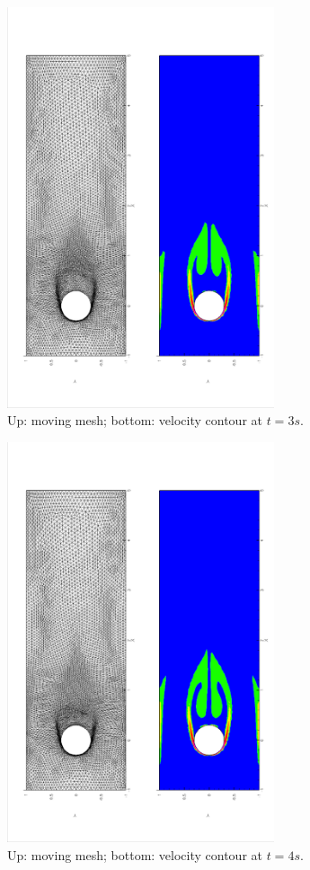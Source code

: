 \documentclass[a4paper, 11pt]{article}
\begin{document}
     \begin{figure}[!htbp]
        \centering
        \includegraphics[width = 0.7\textwidth, angle = -90]{picture/obstacle_flow_data/mesh_t_3s.eps}
        \caption{\small Up: moving mesh; bottom: velocity contour at
          $t = 3s$.}
        \label{fig::cylinder_mesh_t3s}
      \end{figure}

     \begin{figure}[!htbp]
        \centering
        \includegraphics[width = 0.7\textwidth, angle = -90]{picture/obstacle_flow_data/mesh_t_4s.eps}
        \caption{\small Up: moving mesh; bottom: velocity contour at
          $t = 4s$.}
        \label{fig::cylinder_mesh_t4s}
      \end{figure}
\end{document}
